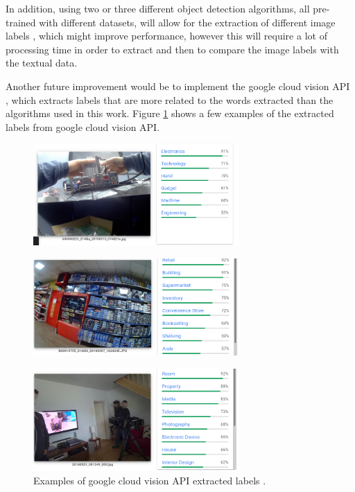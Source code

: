 In addition, using two or three different object detection algorithms, all pre-trained with different datasets, will allow for the extraction of different image labels , which might improve performance, however this will require a lot of processing time in order to extract and then to compare the image labels with the textual data.

Another future improvement would be to implement the google cloud vision API \cite{google}, which extracts labels that are more related to the words extracted than the algorithms used in this work. Figure \ref{fig:visiiion} shows a few examples of the extracted labels from google cloud vision API.
\newpage

\begin{figure}[H]
    \centering
    \captionsetup{justification=centering}
    \includegraphics[width=0.7\textwidth]{Sections/8Conclusion/images/google.png} 
  

  \end{figure}


\begin{figure}[H]
    \centering
    \captionsetup{justification=centering}
    \includegraphics[width=0.7\textwidth]{Sections/8Conclusion/images/labels.png}
  

  \end{figure}
  


\begin{figure}[H]
    \centering
    \captionsetup{justification=centering}

    \includegraphics[width=0.7\textwidth]{Sections/8Conclusion/images/google_labels_2.png}
    
    \caption[Google cloud vision API labels]{Examples of google cloud vision API extracted labels \cite{google}.}
    \label{fig:visiiion}
\end{figure}

